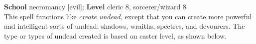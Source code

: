 \textbf{School} necromancy [evil]; \textbf{Level} cleric 8, sorcerer/wizard 8\\
This spell functions like \textit{create undead,} except that you can create more powerful and intelligent sorts of undead: shadows, wraiths, spectres, and devourers. The type or types of undead created is based on caster level, as shown below.\\
